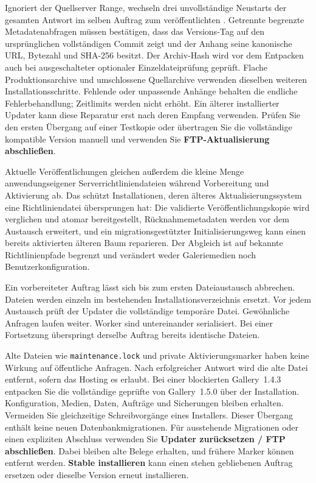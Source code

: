 \documentclass[11pt,a4paper]{article}
\newcommand{\filepath}[1]{\path{#1}}
\newcommand{\ui}[1]{\textbf{#1}}
\newcommand{\codeword}[1]{\nolinkurl{#1}}
\begin{document}
Ignoriert der Quellserver Range, wechseln drei unvollständige Neustarts
der gesamten Antwort im selben Auftrag zum veröffentlichten
\filepath{production.zip}. Getrennte begrenzte Metadatenabfragen müssen
bestätigen, dass das Versions-Tag auf den ursprünglichen vollständigen Commit
zeigt und der Anhang seine kanonische URL, Bytezahl und SHA-256 besitzt.
Der Archiv-Hash wird vor dem Entpacken auch bei ausgeschalteter optionaler
Einzeldateiprüfung geprüft. Flache Produktionsarchive und umschlossene
Quellarchive verwenden dieselben weiteren Installationsschritte.
Fehlende oder unpassende Anhänge behalten die endliche Fehlerbehandlung;
Zeitlimits werden nicht erhöht. Ein älterer installierter Updater kann diese
Reparatur erst nach deren Empfang verwenden. Prüfen Sie den ersten Übergang
auf einer Testkopie oder übertragen Sie die vollständige kompatible Version
manuell und verwenden Sie \ui{FTP-Aktualisierung abschließen}.

Aktuelle Veröffentlichungen gleichen außerdem die kleine Menge anwendungseigener
Serverrichtliniendateien während Vorbereitung und Aktivierung ab. Das schützt
Installationen, deren älteres Aktualisierungssystem eine Richtliniendatei
übersprungen hat: Die validierte Veröffentlichungskopie wird verglichen und
atomar bereitgestellt, Rücknahmemetadaten werden vor dem Austausch erweitert,
und ein migrationsgestützter Initialisierungsweg kann einen bereits aktivierten
älteren Baum reparieren. Der Abgleich ist auf bekannte Richtlinienpfade begrenzt
und verändert weder Galeriemedien noch Benutzerkonfiguration.

Ein vorbereiteter Auftrag lässt sich bis zum ersten Dateiaustausch abbrechen.
Dateien werden einzeln im bestehenden Installationsverzeichnis ersetzt.
Vor jedem Austausch prüft der Updater die vollständige temporäre Datei.
Gewöhnliche Anfragen laufen weiter. Worker sind untereinander serialisiert.
Bei einer Fortsetzung überspringt derselbe Auftrag bereits identische Dateien.

Alte Dateien wie \codeword{maintenance.lock} und private Aktivierungsmarker
haben keine Wirkung auf öffentliche Anfragen. Nach erfolgreicher Antwort
wird die alte Datei entfernt, sofern das Hosting es erlaubt. Bei einer blockierten
Gallery~1.4.3 entpacken Sie die vollständige geprüfte \filepath{production.zip}
von Gallery~1.5.0 über der Installation. Konfiguration, Medien, Daten, Aufträge
und Sicherungen bleiben erhalten. Vermeiden Sie gleichzeitige Schreibvorgänge
eines Installers. Dieser Übergang enthält keine neuen Datenbankmigrationen.
Für ausstehende Migrationen oder einen expliziten Abschluss verwenden Sie
\ui{Updater zurücksetzen / FTP abschließen}. Dabei bleiben alte Belege
erhalten, und frühere Marker können entfernt werden. \ui{Stable installieren}
kann einen stehen gebliebenen Auftrag ersetzen oder dieselbe Version erneut
installieren.
\end{document}
